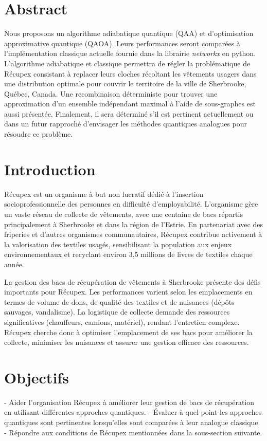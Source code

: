 \documentclass[11pt]{article}
\begin{document}

\tableofcontents
\newpage
\section*{Abstract}
Nous proposons un algorithme adiabatique quantique (QAA) et d'optimisation approximative quantique (QAOA). Leurs performances seront comparées à l'implémentation classique actuelle fournie dans la librairie \textit{networkx} en python. L'algorithme adiabatique et classique permettra de régler la problématique de Récupex consistant à replacer leurs cloches récoltant les vêtements usagers dans une distribution optimale pour couvrir le territoire de la ville de Sherbrooke, Québec, Canada. Une recombinaison déterministe pour trouver une approximation d'un ensemble indépendant maximal à l'aide de sous-graphes est aussi présentée. Finalement, il sera déterminé s'il est pertinent actuellement ou dans un futur rapproché d'envisager les méthodes quantiques analogues pour résoudre ce problème.

\section{Introduction}
Récupex est un organisme à but non lucratif dédié à l’insertion socioprofessionnelle des personnes en difficulté d’employabilité. L’organisme gère un vaste réseau de collecte de vêtements, avec une centaine de bacs répartis principalement à Sherbrooke et dans la région de l’Estrie. En partenariat avec des friperies et d’autres organismes communautaires, Récupex contribue activement à la valorisation des textiles usagés, sensibilisant la population aux enjeux environnementaux et recyclant environ 3,5 millions de livres de textiles chaque année.

La gestion des bacs de récupération de vêtements à Sherbrooke présente des défis importants pour Récupex. Les performances varient selon les emplacements en termes de volume de dons, de qualité des textiles et de nuisances (dépôts sauvages, vandalisme). La logistique de collecte demande des ressources significatives (chauffeurs, camions, matériel), rendant l'entretien complexe. Récupex cherche donc à optimiser l'emplacement de ses bacs pour améliorer la collecte, minimiser les nuisances et assurer une gestion efficace des ressources.

\section{Objectifs}
- Aider l'organisation Récupex à améliorer leur gestion de bacs de récupération en utilisant différentes approches quantiques.
- Évaluer à quel point les approches quantiques sont pertinentes lorsqu’elles sont comparées à leur analogue classique.
- Répondre aux conditions de Récupex mentionnées dans la sous-section suivante.
\end{document}
